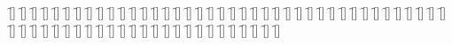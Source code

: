 \begin{questions}
\begin{multicols}{2}
        \question  \f[]
        \question  \f[]
        \question  \f[]
        \question  \f[]
        \question  \f[]
        \question  \f[]
        \question  \f[]
        \question  \f[]
        \question  \f[]
        \question  \f[]
        \question  \f[]
        \question  \f[]
        \question  \f[]
        \question  \f[]
        \question  \f[]
        \question  \f[]
        \question  \f[]
        \question  \f[]
        \question  \f[]
        \question  \f[]
        \question  \f[]
        \question  \f[]
        \question  \f[]
        \question  \f[]
        \question  \f[]
        \question  \f[]
        \question  \f[]
        \question  \f[]
        \question  \f[]
        \question  \f[]
        \question  \f[]
        \question  \f[]
        \question  \f[]
        \question  \f[]
        \question  \f[]
        \question  \f[]
        \question  \f[]
        \question  \f[]
        \question  \f[]
        \question  \f[]
        \question  \f[]
        \question  \f[]
        \question  \f[]
        \question  \f[]
        \question  \f[]
        \question  \f[]
        \question  \f[]
        \question  \f[]
        \question  \f[]
        \question  \f[]
        \question  \f[]
        \question  \f[]
        \question  \f[]
        \question  \f[]
        \question  \f[]
        \question  \f[]
        \question  \f[]
        \question  \f[]
        \question  \f[]
        \question  \f[]
        \question  \f[]
        \question  \f[]
        \question  \f[]
        \question  \f[]
        \question  \f[]
    \end{multicols}
\end{questions}
